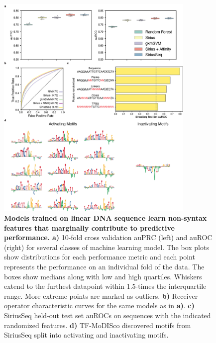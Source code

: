 \begin{figure}[p]
    \centering
    \includegraphics[width=0.85\textwidth]{2_figures-and-files/SuppFig8.png}
    \caption[Models trained on linear DNA sequence learn non-syntax features that marginally contribute to predictive performance.]{\textbf{Models trained on linear DNA sequence learn non-syntax features that marginally contribute to predictive performance.} \textbf{a)} 10-fold cross validation auPRC (left) and auROC (right) for several classes of machine learning model. The box plots show distributions for each performance metric and each point represents the performance on an individual fold of the data. The boxes show medians along with low and high quartiles. Whiskers extend to the furthest datapoint within 1.5-times the interquartile range. More extreme points are marked as outliers. \textbf{b)} Receiver operator characteristic curves for the same models as in \textbf{a)}. \textbf{c)} SiriusSeq held-out test set auROCs on sequences with the indicated randomized features. \textbf{d)} TF-MoDISco discovered motifs from SiriusSeq split into activating and inactivating motifs.}
    \label{fig:supplementary_8}
\end{figure}

